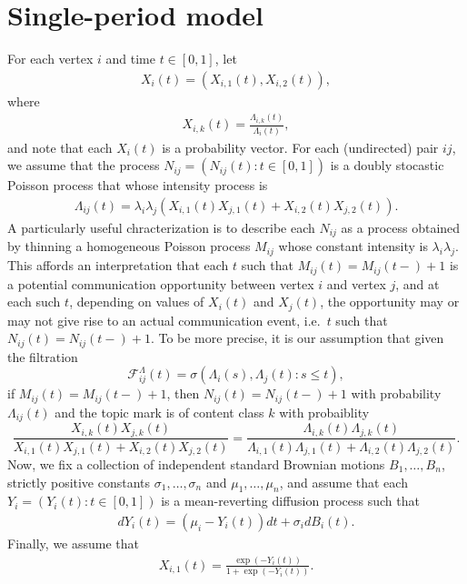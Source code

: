 \documentclass[12pt]{article}%
\begin{document}
\section{Single-period model}
For each vertex $i$ and time $t\in[0,1]$, let 
\begin{eqnarray}
X_i(t) = (X_{i,1}(t), X_{i,2}(t)),
\end{eqnarray}
where
\begin{eqnarray}
X_{i,k}(t) = \frac{\Lambda_{i,k}(t)}{\Lambda_i(t)},
\end{eqnarray}
and note that each $X_i(t)$ is a probability vector. 
For each (undirected) pair $ij$, we assume that 
the process $N_{ij} = (N_{ij}(t):t\in[0,1])$ is   
a doubly stocastic Poisson process that whose intensity process is  
\begin{eqnarray}
\Lambda_{ij}(t) = \lambda_i \lambda_j (X_{i,1}(t)X_{j,1}(t) + X_{i,2}(t)X_{j,2}(t)).
\end{eqnarray}
A particularly useful chracterization is to describe each $N_{ij}$ as a process obtained 
by thinning a homogeneous Poisson process $M_{ij}$ whose constant intensity is $\lambda_i \lambda_j$.  
This affords an interpretation that each $t$ such that $M_{ij}(t) = M_{ij}(t-) +1$ 
is a potential communication opportunity between vertex $i$ and vertex $j$, 
and at each such $t$, depending on values of $X_i(t)$ and $X_j(t)$, 
the opportunity may or may not give rise to an actual communication event, i.e.\ $t$ such that $N_{ij}(t) = N_{ij}(t-) +1$. To be more precise, it is our assumption that given the filtration 
$$
\mathcal F_{ij}^\Lambda(t) = \sigma(\Lambda_i(s), \Lambda_j(t): s \le t), 
$$
if $M_{ij}(t) = M_{ij}(t-)+1$, then
$N_{ij}(t) = N_{ij}(t-) + 1$ with probability $\Lambda_{ij}(t)$ and the topic mark is of content class $k$ with probaiblity 
$$
\frac{X_{i,k}(t)X_{j,k}(t)}{X_{i,1}(t)X_{j,1}(t) + X_{i,2}(t)X_{j,2}(t)}
=
\frac{\Lambda_{i,k}(t)\Lambda_{j,k}(t)}{\Lambda_{i,1}(t)\Lambda_{j,1}(t) + \Lambda_{i,2}(t)\Lambda_{j,2}(t)}.
$$
Now, we fix a collection of independent standard Brownian motions $B_1,\ldots,B_n$, strictly positive constants $\sigma_1,\ldots, \sigma_n$ and $\mu_1,\ldots, \mu_n$, and assume that  
each $Y_i=(Y_i(t):t\in [0,1])$ is a mean-reverting diffusion process such that 
\begin{eqnarray}
dY_i(t) = (\mu_i - Y_i(t)) dt + \sigma_i dB_i(t). 
\end{eqnarray}
Finally, we assume that 
\begin{eqnarray}
X_{i,1}(t) = \frac{\exp(-Y_i(t))}{1+\exp(-Y_i(t))}.
\end{eqnarray}
\end{document}
